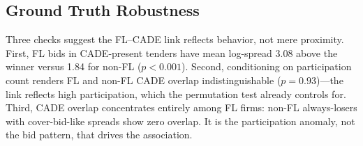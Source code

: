 
\subsection{Ground Truth Robustness}
\label{sec:ground_truth}

Three checks suggest the FL--CADE link reflects behavior, not mere
proximity. First, FL bids in CADE-present tenders have mean
log-spread 3.08 above the winner versus 1.84 for non-FL ($p < 0.001$).
Second, conditioning on participation count renders FL and non-FL
CADE overlap indistinguishable ($p = 0.93$)---the link reflects high
participation, which the permutation test already controls for.
Third, CADE overlap concentrates entirely among FL firms: non-FL
always-losers with cover-bid-like spreads show zero overlap. It is the
participation anomaly, not the bid pattern, that drives the association.

